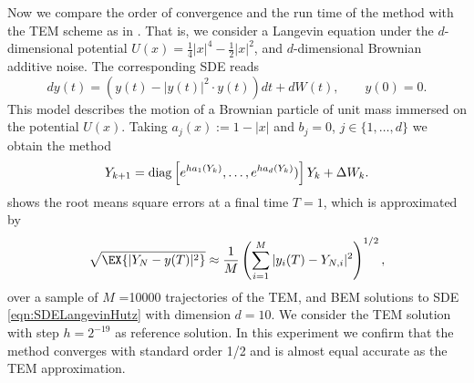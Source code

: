 \begin{example}
	Now we compare the order of convergence and the run time of the \SM method with the TEM scheme as in 
	\cite{Hutzenthaler2012a}. That is, we consider a  Langevin equation under  the $d$-dimensional potential 
	$U(x)= \frac{1}{4}|x|^4 - \frac{1}{2}|x|^2$, and $d$-dimensional Brownian additive noise. The corresponding
	SDE reads
	\begin{equation}\label{eqn:SDELangevinHutz}
	dy(t) = 
		\left(
			y(t) - |y(t)|^2 \cdot y(t)
		\right)dt
		+ dW(t), \qquad y(0)=0.
	\end{equation}
	This model describes the motion of a Brownian particle of unit mass immersed on the potential $U(x)$. 
	Taking $a_j(x):=1-|x|$ and $b_j=0$, $j\in \{1,\dots, d\}$ we obtain the \SM method
	\begin{equation}\label{eqn:LangevinLSMethod}
		Y_{k+1} = \operatorname{diag}
		\left[		
			e^{h a_1(Y_k)}, \dots, e^{ha_d(Y_k)}) 
		\right] 
		Y_k+
		\Delta W_k.
	\end{equation}
	 shows the root means square errors at a final time $T=1$, which is approximated by
	\begin{equation}
		\sqrt{\EX{|Y_N - y(T)|^2}} \approx 
		\frac{1}{M}
		\left(
		\sum_{i=1}^M
		|y_i(T) - Y_{N,i}|^2	
		\right)^{1/2},
	\end{equation}
	over a sample of $M$ =\num{10000} trajectories of the TEM, \SM  and BEM solutions to SDE 
	\eqref{eqn:SDELangevinHutz} with dimension $d=10$.  We consider the TEM solution with step $h=2^{-19}$ as reference 
	solution. 
	In this experiment we confirm that the \SM method converges with standard order 1/2  and is almost equal accurate 
	as the TEM approximation.


\end{example}
